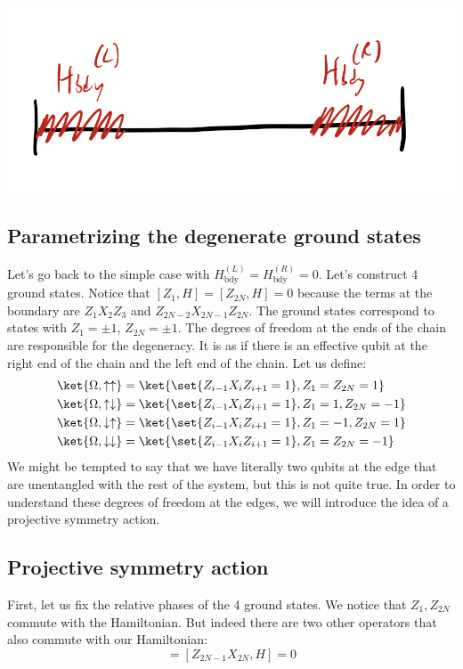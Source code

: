 \begin{center}
    \includegraphics[scale=0.4]{Lectures/Images/lec14-boundaryH.png}
\end{center}

\subsection{Parametrizing the degenerate ground states}
Let's go back to the simple case with $H^{(L)}_{\text{bdy}} = H^{(R)}_{\text{bdy}} = 0$. Let's construct 4 ground states. Notice that $[Z_1, H] = [Z_{2N}, H] = 0$ because the terms at the boundary are $Z_1X_2Z_3$ and $Z_{2N-2}X_{2N-1}Z_{2N}$. The ground states correspond to states with $Z_1 = \pm 1$, $Z_{2N} = \pm 1$. The degrees of freedom at the ends of the chain are responsible for the degeneracy. It is as if there is an effective qubit at the right end of the chain and the left end of the chain. Let us define:
\begin{equation}
    \begin{split}
        \ket{\Omega, \uparrow\uparrow} &= \ket{\set{Z_{i-1}X_iZ_{i+1} = 1}, Z_1 = Z_{2N} = 1}
        \\ \ket{\Omega, \uparrow\downarrow} &= \ket{\set{Z_{i-1}X_iZ_{i+1} = 1}, Z_1 = 1, Z_{2N} = -1}
        \\ \ket{\Omega, \downarrow\uparrow} &= \ket{\set{Z_{i-1}X_iZ_{i+1} = 1}, Z_1 = -1, Z_{2N} = 1}
        \\ \ket{\Omega, \downarrow\downarrow} &= \ket{\set{Z_{i-1}X_iZ_{i+1} = 1}, Z_1 = Z_{2N} = -1}
    \end{split}
\end{equation}
We might be tempted to say that we have literally two qubits at the edge that are unentangled with the rest of the system, but this is not quite true. In order to understand these degrees of freedom at the edges, we will introduce the idea of a projective symmetry action.

\subsection{Projective symmetry action}
First, let us fix the relative phases of the 4 ground states. We notice that $Z_1, Z_{2N}$ commute with the Hamiltonian. But indeed there are two other operators that also commute with our Hamiltonian:
\begin{equation}
    [X_1Z_2, H] = [Z_{2N-1}X_{2N}, H] = 0
\end{equation}

